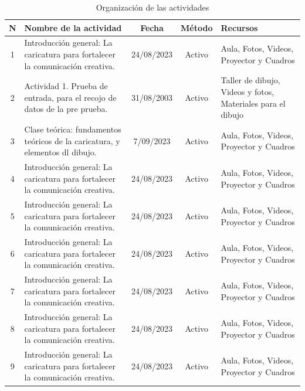 \documentclass[12pt,a4paper]{article}
\begin{document}
\begin{table}
	\caption{Organización de las actividades}
	\label{Organizacion}
	\begin{tabular}{cp{4.5cm}ccp{4cm}}\hline
	N & \bf Nombre de la actividad                                                        & \bf Fecha      & \bf Método & \bf Recursos                                  \\\hline
	1 & Introducción general: La caricatura para fortalecer la comunicación creativa. & 24/08/2023 & Activo & Aula, Fotos, Videos, Proyector  y Cuadros \\\hline
	2 & Actividad 1. Prueba de entrada, para el recojo de datos de la pre prueba. & 31/08/2003 & Activo & Taller de dibujo, Videos y fotos, Materiales para el dibujo\\\hline
	3 & Clase teórica: fundamentos teóricos de la caricatura, y elementos dl dibujo. & 7/09/2023 & Activo & Aula, Fotos, Videos, Proyector  y Cuadros \\\hline
	4 & Introducción general: La caricatura para fortalecer la comunicación creativa. & 24/08/2023 & Activo & Aula, Fotos, Videos, Proyector  y Cuadros \\\hline
	5 & Introducción general: La caricatura para fortalecer la comunicación creativa. & 24/08/2023 & Activo & Aula, Fotos, Videos, Proyector  y Cuadros \\\hline
	6 & Introducción general: La caricatura para fortalecer la comunicación creativa. & 24/08/2023 & Activo & Aula, Fotos, Videos, Proyector  y Cuadros \\\hline
	7 & Introducción general: La caricatura para fortalecer la comunicación creativa. & 24/08/2023 & Activo & Aula, Fotos, Videos, Proyector  y Cuadros \\\hline
	8 & Introducción general: La caricatura para fortalecer la comunicación creativa. & 24/08/2023 & Activo & Aula, Fotos, Videos, Proyector  y Cuadros \\\hline
    9 & Introducción general: La caricatura para fortalecer la comunicación creativa. & 24/08/2023 & Activo & Aula, Fotos, Videos, Proyector  y Cuadros \\\hline
\end{tabular}
\end{table}

	
\end{document}
